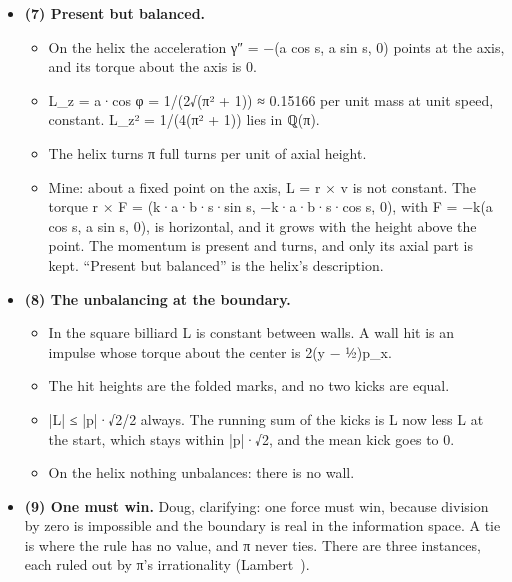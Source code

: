 \begin{itemize}
\begin{itemize}
\item A shifted start slides the whole etch rigidly: an isometry, Lyapunov exponent 0, ε stays ε, and the three gaps are the same. The rotation is uniquely ergodic (Weyl~\cite{src:Weyl-1916}; Walters~\cite{src:Walters-1982}): every start has the same long-run statistics. “The field starting conditions do not matter” holds, and “perturb it differently every time” is the shift.
\item A changed magnitude, with the direction constant, is Doug's wave (6). The rotations by α and by α + ε separate by nε after n encounters with the period 1: linearly, without end, and after about 1/ε encounters the two etches are unrelated. It is not chaos: the growth is linear, not exponential.
\item Every irrational magnitude etches its own never-repeating pattern. A rational one closes.
\end{itemize}
\item \textbf{(7) Present but balanced.}

\begin{itemize}
\item On the helix the acceleration γ″ = −(a cos s, a sin s, 0) points at the axis, and its torque about the axis is 0.
\item L\_\allowbreak{}z = a·cos φ = 1/(2√(π² + 1)) ≈ 0.15166 per unit mass at unit speed, constant. L\_\allowbreak{}z² = 1/(4(π² + 1)) lies in ℚ(π).
\item The helix turns π full turns per unit of axial height.
\item Mine: about a fixed point on the axis, L = r × v is not constant. The torque r × F = (k·a·b·s·sin s, −k·a·b·s·cos s, 0), with F = −k(a cos s, a sin s, 0), is horizontal, and it grows with the height above the point. The momentum is present and turns, and only its axial part is kept. “Present but balanced” is the helix's description.
\end{itemize}
\item \textbf{(8) The unbalancing at the boundary.}

\begin{itemize}
\item In the square billiard L is constant between walls. A wall hit is an impulse whose torque about the center is 2(y − ½)p\_\allowbreak{}x.
\item The hit heights are the folded marks, and no two kicks are equal.
\item |L| ≤ |p|·√2/2 always. The running sum of the kicks is L now less L at the start, which stays within |p|·√2, and the mean kick goes to 0.
\item On the helix nothing unbalances: there is no wall.
\end{itemize}
\item \textbf{(9) One must win.} Doug, clarifying: one force must win, because division by zero is impossible and the boundary is real in the information space. A tie is where the rule has no value, and π never ties. There are three instances, each ruled out by π's irrationality (Lambert~\cite{src:Lambert-1761}).


\end{itemize}
